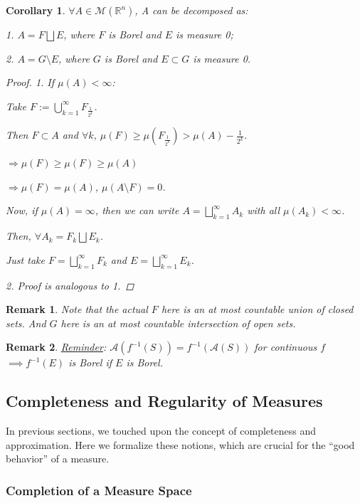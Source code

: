 \documentclass[12pt]{article}
\theoremstyle{blueplain}
\newtheorem{corollary}[theorem]{Corollary}
\theoremstyle{bluedef}
\theoremstyle{blueremark}
\newtheorem{remark}{Remark}[section]
\newcommand{\R}{\mathbb{R}}
\numberwithin{equation}{section}
\begin{document}
\begin{corollary}
  $\forall A \in \mathcal{M}(\R^n)$, A can be decomposed as:

  1. $A = F \bigsqcup E$, where $F$ is Borel and $E$ is measure 0;

  2. $A = G \setminus E$, where $G$ is Borel and $E \subset G$ is measure 0.
  \begin{proof}
    1. If $\mu(A) < \infty$:

    Take $F := \bigcup_{k=1}^{\infty} F_{\frac{1}{2^k}}$.

    Then $F \subset A$ and $\forall k$, $\mu(F) \geq \mu(F_{\frac{1}{2^k}}) > \mu(A) - \frac{1}{2^k}$.

    $\Rightarrow \mu(F) \geq \mu(F) \geq \mu(A)$

    $\Rightarrow \mu(F) = \mu(A)$, $\mu(A \setminus F) = 0$.

    Now, if $\mu(A) = \infty$, then we can write $A = \bigsqcup_{k=1}^{\infty} A_k$ with all $\mu(A_k) < \infty$.

    Then, $\forall A_k = F_k \bigsqcup E_k$.

    Just take $F = \bigsqcup_{k=1}^{\infty} F_k$ and $E = \bigsqcup_{k=1}^{\infty} E_k$.

    2. Proof is analogous to 1.
  \end{proof}
\end{corollary}

\begin{remark}
  Note that the actual $F$ here is an at most countable union of closed sets. And $G$ here is an at most countable intersection of open sets.
\end{remark}

\begin{remark}
  \underline{Reminder}: $\mathcal{A}(f^{-1}(S)) = f^{-1}(\mathcal{A}(S))$ for continuous $f$ $\implies f^{-1} (E)$ is Borel if $E$ is Borel.
\end{remark}

\clearpage

\subsection{Completeness and Regularity of Measures}

In previous sections, we touched upon the concept of completeness and approximation. Here we formalize these notions, which are crucial for the ``good behavior'' of a measure.

\subsubsection{Completion of a Measure Space}
\end{document}
